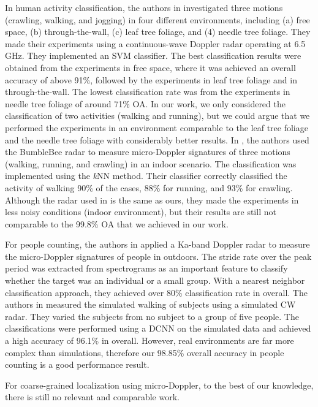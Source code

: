 In human activity classification, the authors in \cite{zenaldin2016radar} investigated three motions (crawling, walking, and jogging) in four different environments, including (a) free space, (b) through-the-wall, (c) leaf tree foliage, and (4) needle tree foliage. They made their experiments using a continuous-wave Doppler radar operating at 6.5 GHz. They implemented an SVM classifier. The best classification results were obtained from the experiments in free space, where it was achieved an overall accuracy of above 91\%, followed by the experiments in leaf tree foliage and in through-the-wall. The lowest classification rate was from the experiments in needle tree foliage of around 71\% OA. In our work, we only considered the classification of two activities (walking and running), but we could argue that we performed the experiments in an environment comparable to the leaf tree foliage and the needle tree foliage with considerably better results.  In \cite{zenaldin2016radar}, the authors used the BumbleBee radar to measure micro-Doppler signatures of three motions (walking, running, and crawling) in an indoor scenario. The classification was implemented using the \textit{k}NN method. Their classifier correctly classified the activity of walking 90\% of the cases, 88\% for running, and 93\% for crawling. Although the radar used in \cite{zenaldin2016radar} is the same as ours, they made the experiments in less noisy conditions (indoor environment), but their results are still not comparable to the 99.8\% OA that we achieved in our work.

For people counting, the authors in \cite{tahmoush2009radar} applied a Ka-band Doppler radar to measure the micro-Doppler signatures of people in outdoors. The stride rate over the peak period was extracted from spectrograms as an important feature to classify whether the target was an individual or a small group. With a nearest neighbor classification approach, they achieved over 80\% classification rate in overall. The authors in \cite{trommel2016multi} measured the simulated walking of subjects using a simulated CW radar. They varied the subjects from no subject to a group of five people. The classifications were performed using a DCNN on the simulated data and achieved a high accuracy of 96.1\% in overall. However, real environments are far more complex than simulations, therefore our 98.85\% overall accuracy in people counting is a good performance result.

For coarse-grained localization using micro-Doppler, to the best of our knowledge, there is still no relevant and comparable work. 

